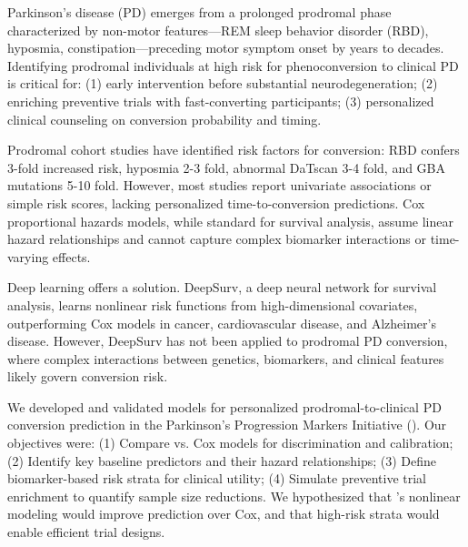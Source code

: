 Parkinson's disease (PD) emerges from a prolonged prodromal phase characterized by non-motor features—REM sleep behavior disorder (RBD), hyposmia, constipation—preceding motor symptom onset by years to decades\cite{postuma2015prodromal,berg2015time}. Identifying prodromal individuals at high risk for phenoconversion to clinical PD is critical for: (1) early intervention before substantial neurodegeneration; (2) enriching preventive trials with fast-converting participants; (3) personalized clinical counseling on conversion probability and timing\cite{marek2013mdsuppcc,postuma2019risk}.

Prodromal cohort studies have identified risk factors for conversion: RBD confers 3-fold increased risk\cite{postuma2015prodromal}, hyposmia 2-3 fold\cite{ponsen2004idiopathic}, abnormal DaTscan 3-4 fold\cite{jennings2017conversion}, and GBA mutations 5-10 fold\cite{alcalay2012cognitive,iwaki2019genetic}. However, most studies report univariate associations or simple risk scores\cite{berg2015time}, lacking personalized time-to-conversion predictions. Cox proportional hazards models\cite{cox1972regression}, while standard for survival analysis, assume linear hazard relationships and cannot capture complex biomarker interactions or time-varying effects.

Deep learning offers a solution. DeepSurv\cite{katzman2018deepsurv}, a deep neural network for survival analysis, learns nonlinear risk functions from high-dimensional covariates, outperforming Cox models in cancer\cite{katzman2018deepsurv}, cardiovascular disease\cite{nagpal2021deep}, and Alzheimer's disease\cite{nguyen2021deep}. However, DeepSurv has not been applied to prodromal PD conversion, where complex interactions between genetics, biomarkers, and clinical features likely govern conversion risk.

We developed and validated \deepsurv{} models for personalized prodromal-to-clinical PD conversion prediction in the Parkinson's Progression Markers Initiative (\ppmi). Our objectives were: (1) Compare \deepsurv{} vs. Cox models for discrimination and calibration; (2) Identify key baseline predictors and their hazard relationships; (3) Define biomarker-based risk strata for clinical utility; (4) Simulate preventive trial enrichment to quantify sample size reductions. We hypothesized that \deepsurv's nonlinear modeling would improve prediction over Cox, and that high-risk strata would enable efficient trial designs.
